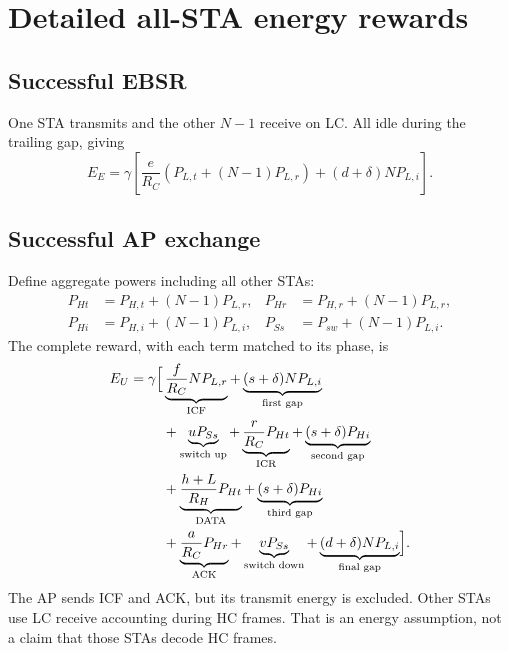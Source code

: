 \documentclass[11pt,a4paper]{article}
\begin{document}
\section{Detailed all-STA energy rewards}
\subsection{Successful EBSR}
One STA transmits and the other $N-1$ receive on LC. All idle during the
trailing gap, giving
\begin{equation}
E_E=\gamma\left[\frac e{R_C}(P_{L,t}+(N-1)P_{L,r})
+(d+\delta)NP_{L,i}\right].
\end{equation}

\subsection{Successful AP exchange}
Define aggregate powers including all other STAs:
\begin{align}
P_{Ht}&=P_{H,t}+(N-1)P_{L,r},&P_{Hr}&=P_{H,r}+(N-1)P_{L,r},\\
P_{Hi}&=P_{H,i}+(N-1)P_{L,i},&P_{Ss}&=P_{sw}+(N-1)P_{L,i}.
\end{align}
The complete reward, with each term matched to its phase, is
\begin{align}
E_U=\gamma\Bigl[&
\underbrace{\frac f{R_C}NP_{L,r}}_{\text{ICF}}+
\underbrace{(s+\delta)NP_{L,i}}_{\text{first gap}}\notag\\
&+\underbrace{uP_{Ss}}_{\text{switch up}}+
\underbrace{\frac r{R_C}P_{Ht}}_{\text{ICR}}+
\underbrace{(s+\delta)P_{Hi}}_{\text{second gap}}\notag\\
&+\underbrace{\frac{h+L}{R_H}P_{Ht}}_{\text{DATA}}+
\underbrace{(s+\delta)P_{Hi}}_{\text{third gap}}\notag\\
&+\underbrace{\frac a{R_C}P_{Hr}}_{\text{ACK}}+
\underbrace{vP_{Ss}}_{\text{switch down}}+
\underbrace{(d+\delta)NP_{L,i}}_{\text{final gap}}\Bigr].
\end{align}
The AP sends ICF and ACK, but its transmit energy is excluded. Other STAs
use LC receive accounting during HC frames. That is an energy assumption,
not a claim that those STAs decode HC frames.
\end{document}
